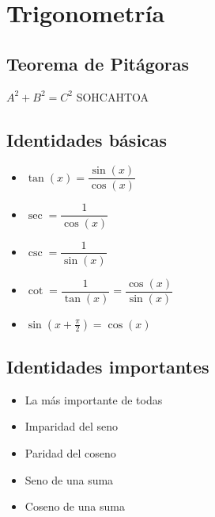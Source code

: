 \section{Trigonometría}

\subsection*{Teorema de Pitágoras}

\hfil
$A^2 + B^2 = C^2$
\hfil
SOHCAHTOA
\hfil

\subsection*{Identidades básicas}

\begin{itemize}
\item $\tan(x) = \dfrac{\sin(x)}{\cos(x)}$
\item $\sec = \dfrac{1}{\cos(x)}$
\item $\csc = \dfrac{1}{\sin(x)}$
\item $\cot = \dfrac{1}{\tan(x)} = \dfrac{\cos(x)}{\sin(x)}$
\item $\sin\left(x + \frac{\pi}{2}\right) = \cos(x)$
\end{itemize}

\subsection*{Identidades importantes}

\begin{itemize}
    \item {} La más importante de todas

    \item {} Imparidad del seno

    \item {} Paridad del coseno

    \item {} Seno de una suma
    
    \item {} Coseno de una suma
\end{itemize}





